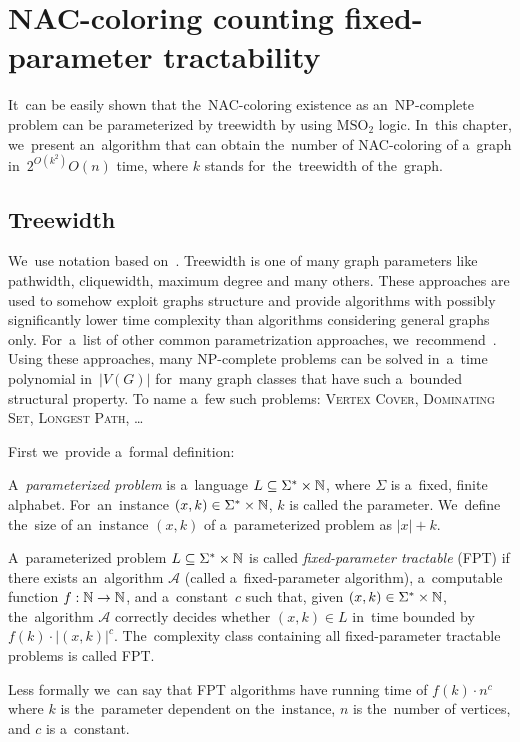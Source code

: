 
\chapter{NAC-coloring counting fixed-parameter tractability}%
\label{chapter:fpt}

\begin{chapterabstract}

	It~can be easily shown that the~NAC-coloring existence as an~NP-complete
	problem can be parameterized by treewidth by using \( \text{MSO}_2 \) logic.
	In~this chapter, we~present an~algorithm that can obtain
	the~number of NAC-coloring of a~graph in~\(2^{O(k^2)} O(n)\) time,
	where \(k\) stands for~the~treewidth of the~graph.

\end{chapterabstract}

\section{Treewidth}

We~use notation based on~\cite{book_parametrized_algorithms}.
Treewidth is one of many graph parameters like
pathwidth, cliquewidth, maximum degree and many others.
These approaches are used to somehow exploit graphs structure
and provide algorithms with possibly significantly lower time complexity
than algorithms considering general graphs only.
For~a~list of other common parametrization approaches,
we~recommend~\cite{tree_width_comparision_other_classes}.
Using these approaches, many NP-complete problems can be solved
in~a~time polynomial in~\( |V(G)| \)
for~many graph classes that have such a~bounded structural property.
To name a~few such problems:
\textsc{Vertex Cover}, \textsc{Dominating Set}, \textsc{Longest Path}, \dots

First we~provide a~formal definition:
%
\begin{definition}
	A~\emph{parameterized problem} is a~language \( L \subseteq \Sigma^* \times \mathbb{N} \), where
	\( \Sigma \) is a~fixed, finite alphabet. For~an~instance \( (x, k) \in \Sigma^* \times \mathbb{N} \), \( k \) is called the
	parameter.
	We~define the~size of an~instance \( (x, k) \) of a~parameterized problem as \( |x| + k \).
\end{definition}
%
\begin{definition}
	A~parameterized problem \( L \subseteq \Sigma^* \times \mathbb{N} \) is called \emph{fixed-parameter tractable} (FPT)
	if there exists an~algorithm \( \mathcal{A} \) (called a~fixed-parameter
	algorithm), a~computable function \( f: \mathbb{N} \to \mathbb{N} \), and a~constant~\( c \)
	such that, given \( (x, k) \in \Sigma^* \times \mathbb{N} \), the~algorithm \( \mathcal{A} \)
	correctly decides
	whether \( (x, k) \in L \) in~time bounded by \( f(k) \cdot |(x, k)|^c \). The~complexity
	class containing all fixed-parameter tractable problems is called FPT\@.
\end{definition}
%
Less formally we~can say that FPT algorithms
have running time of \( f(k)\cdot n^c \)
where \( k \) is the~parameter dependent on the~instance,
\( n \) is the~number of vertices,
and \( c \) is a~constant.

